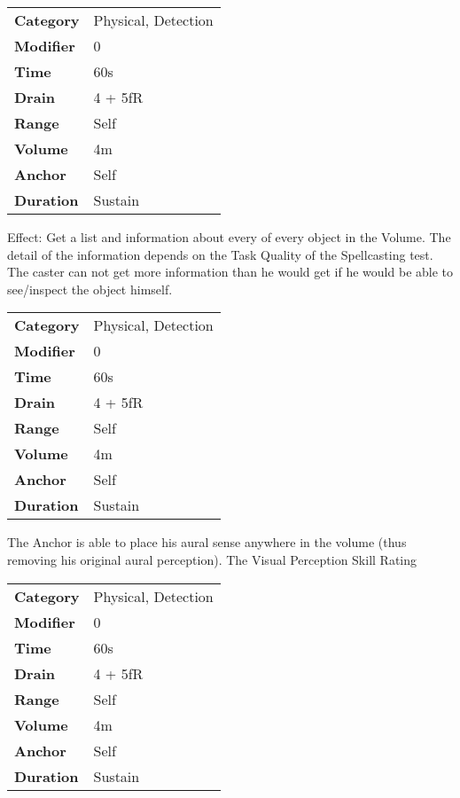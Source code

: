 \begin{tabular}{ll}
    \textbf{Category} & Physical, Detection \\
    \textbf{Modifier} & 0                   \\
    \textbf{Time}     & 60s                 \\
    \textbf{Drain}    & 4 + 5fR             \\
    \textbf{Range}    & Self                \\
    \textbf{Volume}   & 4m                  \\
    \textbf{Anchor}   & Self                \\
    \textbf{Duration} & Sustain             \\
\end{tabular}

\hfil
Effect: Get a list and information about every of every object in the
Volume. The detail of the information depends on
the Task Quality of the
Spellcasting test. The caster can not get
more information than he would get if he would be able to see/inspect
the object himself.



\begin{tabular}{ll}
    \textbf{Category} & Physical, Detection \\
    \textbf{Modifier} & 0                   \\
    \textbf{Time}     & 60s                 \\
    \textbf{Drain}    & 4 + 5fR             \\
    \textbf{Range}    & Self                \\
    \textbf{Volume}   & 4m                  \\
    \textbf{Anchor}   & Self                \\
    \textbf{Duration} & Sustain             \\
\end{tabular}

\hfil

The Anchor is able to place his aural sense
anywhere in the volume (thus removing his original aural perception).
The Visual Perception Skill
Rating



\begin{tabular}{ll}
    \textbf{Category} & Physical, Detection \\
    \textbf{Modifier} & 0                   \\
    \textbf{Time}     & 60s                 \\
    \textbf{Drain}    & 4 + 5fR             \\
    \textbf{Range}    & Self                \\
    \textbf{Volume}   & 4m                  \\
    \textbf{Anchor}   & Self                \\
    \textbf{Duration} & Sustain             \\
\end{tabular}

